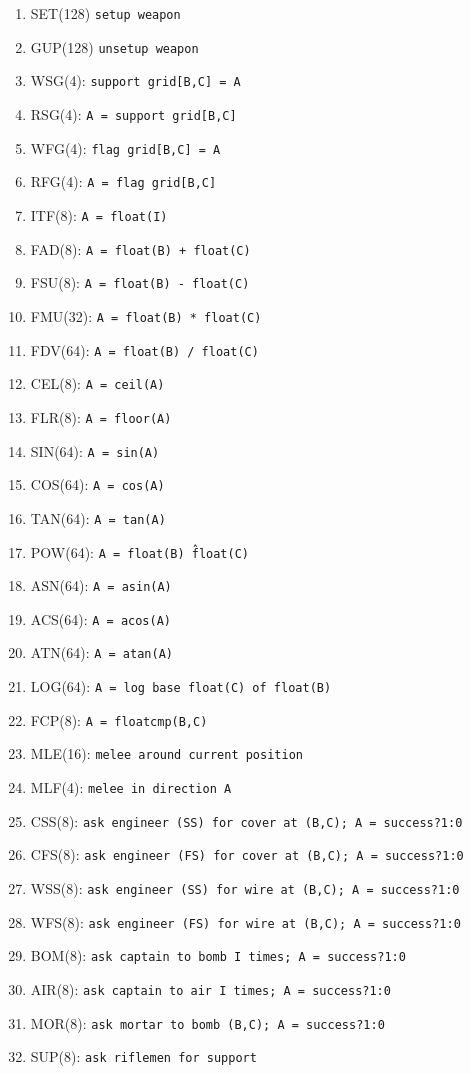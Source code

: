 \documentclass{article}
\begin{document}
\begin{enumerate}[noitemsep]
    \item SET(128) \texttt{setup weapon}
    \item GUP(128) \texttt{unsetup weapon}
    \item WSG(4): \texttt{support grid[B,C] = A}
    \item RSG(4): \texttt{A = support grid[B,C]}
    \item WFG(4): \texttt{flag grid[B,C] = A}
    \item RFG(4): \texttt{A = flag grid[B,C]}
    \item ITF(8): \texttt{A = float(I)}
    \item FAD(8): \texttt{A = float(B) + float(C)}
    \item FSU(8): \texttt{A = float(B) - float(C)}
    \item FMU(32): \texttt{A = float(B) * float(C)}
    \item FDV(64): \texttt{A = float(B) / float(C)}
    \item CEL(8): \texttt{A = ceil(A)}
    \item FLR(8): \texttt{A = floor(A)}
    \item SIN(64): \texttt{A = sin(A)}
    \item COS(64): \texttt{A = cos(A)}
    \item TAN(64): \texttt{A = tan(A)}
    \item POW(64): \texttt{A = float(B) \^ float(C)}
    \item ASN(64): \texttt{A = asin(A)}
    \item ACS(64): \texttt{A = acos(A)}
    \item ATN(64): \texttt{A = atan(A)}
    \item LOG(64): \texttt{A = log base float(C) of float(B)}
    \item FCP(8): \texttt{A = floatcmp(B,C)}
    \item MLE(16): \texttt{melee around current position}
    \item MLF(4): \texttt{melee in direction A}
    \item CSS(8): \texttt{ask engineer (SS) for cover at (B,C); A = success?1:0}
    \item CFS(8): \texttt{ask engineer (FS) for cover at (B,C); A = success?1:0}
    \item WSS(8): \texttt{ask engineer (SS) for wire at (B,C); A = success?1:0}
    \item WFS(8): \texttt{ask engineer (FS) for wire at (B,C); A = success?1:0}
    \item BOM(8): \texttt{ask captain to bomb I times; A = success?1:0}
    \item AIR(8): \texttt{ask captain to air I times; A = success?1:0}
    \item MOR(8): \texttt{ask mortar to bomb (B,C); A = success?1:0}
    \item SUP(8): \texttt{ask riflemen for support}
\end{enumerate}
\end{document}

